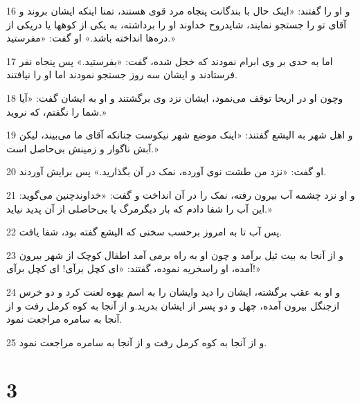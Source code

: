 \par 16 و او را گفتند: «اینک حال با بندگانت پنجاه مرد قوی هستند، تمنا اینکه ایشان بروند و آقای تو را جستجو نمایند، شایدروح خداوند او را برداشته، به یکی از کوهها یا دریکی از دره‌ها انداخته باشد.» او گفت: «مفرستید.»
\par 17 اما به حدی بر وی ابرام نمودند که خجل شده، گفت: «بفرستید.» پس پنجاه نفر فرستادند و ایشان سه روز جستجو نمودند اما او را نیافتند.
\par 18 وچون او در اریحا توقف می‌نمود، ایشان نزد وی برگشتند و او به ایشان گفت: «آیا شما را نگفتم، که نروید.»
\par 19 و اهل شهر به الیشع گفتند: «اینک موضع شهر نیکوست چنانکه آقای ما می‌بیند، لیکن آبش ناگوار و زمینش بی‌حاصل است.»
\par 20 او گفت: «نزد من طشت نوی آورده، نمک در آن بگذارید.» پس برایش آوردند.
\par 21 و او نزد چشمه آب بیرون رفته، نمک را در آن انداخت و گفت: «خداوندچنین می‌گوید: این آب را شفا دادم که بار دیگرمرگ یا بی‌حاصلی از آن پدید نیاید.»
\par 22 پس آب تا به امروز برحسب سخنی که الیشع گفته بود، شفا یافت.
\par 23 و از آنجا به بیت ئیل برآمد و چون او به راه برمی آمد اطفال کوچک از شهر بیرون آمده، او راسخریه نموده، گفتند: «ای کچل برآی! ای کچل برآی!»
\par 24 و او به عقب برگشته، ایشان را دید وایشان را به اسم یهوه لعنت کرد و دو خرس ازجنگل بیرون آمده، چهل و دو پسر از ایشان بدرید.و از آنجا به کوه کرمل رفت و از آنجا به سامره مراجعت نمود.
\par 25 و از آنجا به کوه کرمل رفت و از آنجا به سامره مراجعت نمود.
 
\chapter{3}

